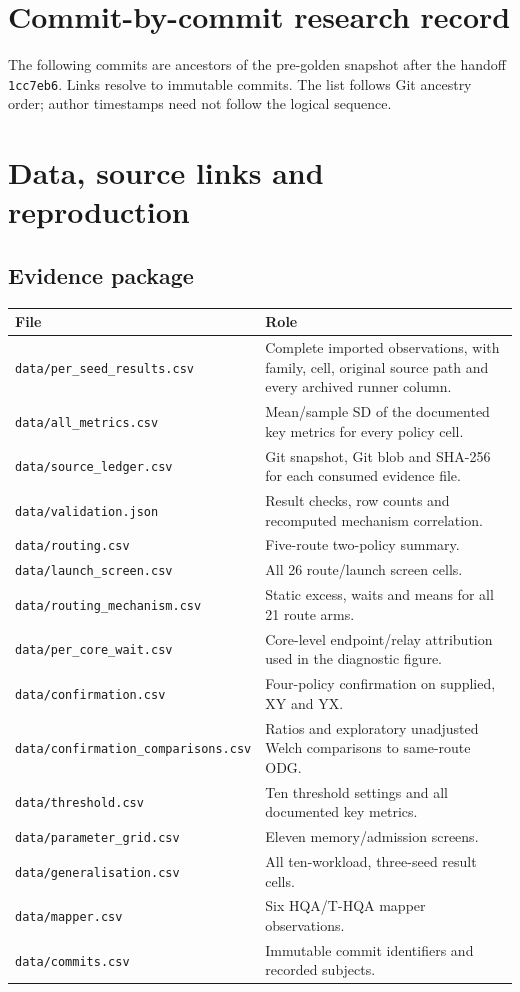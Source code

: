 \documentclass[11pt,a4paper,oneside]{report}
\begin{document}
\appendix
\chapter{Commit-by-commit research record}
The following commits are ancestors of the pre-golden snapshot after the handoff \texttt{1cc7eb6}. Links resolve to immutable commits. The list follows Git ancestry order; author timestamps need not follow the logical sequence.


\chapter{Data, source links and reproduction}
\section{Evidence package}
\begin{longtable}{p{.37\linewidth}p{.55\linewidth}}
\toprule File & Role\\\midrule\endhead
\texttt{data/per\_seed\_results.csv} & Complete imported observations, with family, cell, original source path and every archived runner column.\\
\texttt{data/all\_metrics.csv} & Mean/sample SD of the documented key metrics for every policy cell.\\
\texttt{data/source\_ledger.csv} & Git snapshot, Git blob and SHA-256 for each consumed evidence file.\\
\texttt{data/validation.json} & Result checks, row counts and recomputed mechanism correlation.\\
\texttt{data/routing.csv} & Five-route two-policy summary.\\
\texttt{data/launch\_screen.csv} & All 26 route/launch screen cells.\\
\texttt{data/routing\_mechanism.csv} & Static excess, waits and means for all 21 route arms.\\
\texttt{data/per\_core\_wait.csv} & Core-level endpoint/relay attribution used in the diagnostic figure.\\
\texttt{data/confirmation.csv} & Four-policy confirmation on supplied, XY and YX.\\
{\scriptsize\texttt{data/confirmation\_comparisons.csv}} & Ratios and exploratory unadjusted Welch comparisons to same-route ODG.\\
\texttt{data/threshold.csv} & Ten threshold settings and all documented key metrics.\\
\texttt{data/parameter\_grid.csv} & Eleven memory/admission screens.\\
\texttt{data/generalisation.csv} & All ten-workload, three-seed result cells.\\
\texttt{data/mapper.csv} & Six HQA/T-HQA mapper observations.\\
\texttt{data/commits.csv} & Immutable commit identifiers and recorded subjects.\\
\bottomrule
\end{longtable}
\end{document}
